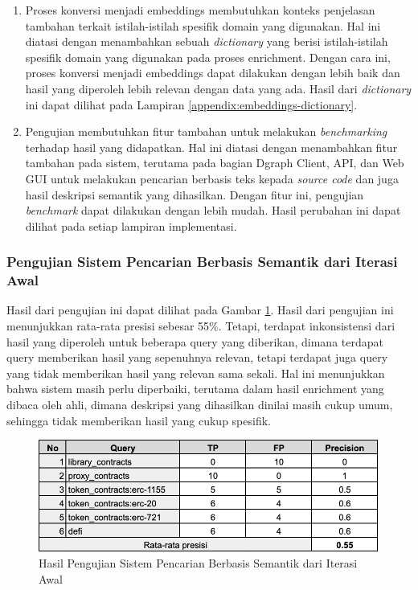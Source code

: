 \begin{enumerate}
	\item Proses konversi menjadi embeddings membutuhkan konteks penjelasan tambahan terkait istilah-istilah spesifik domain yang digunakan. Hal ini diatasi dengan menambahkan sebuah \textit{dictionary} yang berisi istilah-istilah spesifik domain yang digunakan pada proses enrichment. Dengan cara ini, proses konversi menjadi embeddings dapat dilakukan dengan lebih baik dan hasil yang diperoleh lebih relevan dengan data yang ada. Hasil dari \textit{dictionary} ini dapat dilihat pada Lampiran \ref{appendix:embeddings-dictionary}.
	\item Pengujian membutuhkan fitur tambahan untuk melakukan \textit{benchmarking} terhadap hasil yang didapatkan. Hal ini diatasi dengan menambahkan fitur tambahan pada sistem, terutama pada bagian Dgraph Client, API, dan Web GUI untuk melakukan pencarian berbasis teks kepada \textit{source code} dan juga hasil deskripsi semantik yang dihasilkan. Dengan fitur ini, pengujian \textit{benchmark} dapat dilakukan dengan lebih mudah. Hasil perubahan ini dapat dilihat pada setiap lampiran implementasi.
\end{enumerate}

\subsubsection{Pengujian Sistem Pencarian Berbasis Semantik dari Iterasi Awal}

Hasil dari pengujian ini dapat dilihat pada Gambar \ref{image:pengujian-1}. Hasil dari pengujian ini menunjukkan rata-rata presisi sebesar 55\%. Tetapi, terdapat inkonsistensi dari hasil yang diperoleh untuk beberapa query yang diberikan, dimana terdapat query memberikan hasil yang sepenuhnya relevan, tetapi terdapat juga query yang tidak memberikan hasil yang relevan sama sekali. Hal ini menunjukkan bahwa sistem masih perlu diperbaiki, terutama dalam hasil enrichment yang dibaca oleh ahli, dimana deskripsi yang dihasilkan dinilai masih cukup umum, sehingga tidak memberikan hasil yang cukup spesifik.

\begin{figure}[ht]
	\centering
	\includegraphics[width=1\textwidth]{resources/chapter-4/data-1-1.png}
	\caption{Hasil Pengujian Sistem Pencarian Berbasis Semantik dari Iterasi Awal}
	\label{image:pengujian-1}
\end{figure}

